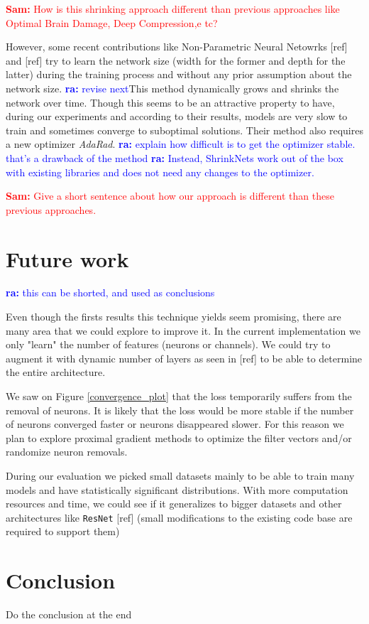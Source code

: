 \documentclass[sigconf]{acmart}
\newcommand{\srm}[1]{\textcolor{red}{{\bf Sam:} #1}}
\newcommand{\ra}[1]{\textcolor{blue}{{\bf ra:} #1}}
\begin{document}
\srm{How is this shrinking
approach different than previous approaches like Optimal Brain Damage, Deep
Compression,e tc?} 

\par However, some recent contributions like Non-Parametric Neural Netowrks
[ref] and [ref] try to learn the network size (width for the former and depth
for the latter) during the training process and without any prior assumption
about the network size. \ra{revise next}This method dynamically grows and shrinks the network
over time. Though this seems to be an attractive property to have, during our
experiments and according to their results, models are very slow to train and
sometimes converge to suboptimal solutions. Their method also requires a new
optimizer \textit{AdaRad}. \ra{explain how difficult is to get the optimizer
stable. that's a drawback of the method} \ra{Instead, ShrinkNets work out of the
box with existing libraries and does not need any changes to the optimizer.}

\srm{Give a short sentence about how our approach is
different than these previous approaches.} 

\section{Future work}

\ra{this can be shorted, and used as conclusions}

\par Even though the firsts results this technique yields seem promising, there
are many area that we could explore to improve it. In the current implementation
we only "learn" the number of features (neurons or channels). We could try to
augment it with dynamic number of layers as seen in [ref] to be able to
determine the entire architecture.  \par We saw on Figure \ref{convergence_plot}
that the loss temporarily suffers from the removal of neurons. It is likely that
the loss would be more stable if the number of neurons converged faster or
neurons disappeared slower. For this reason we plan to explore proximal gradient
methods to optimize the filter vectors and/or randomize neuron removals.  \par
During our evaluation we picked small datasets mainly to be able to train many
models and have statistically significant distributions. With more computation
resources and time, we could see if it generalizes to bigger datasets and other
architectures like \texttt{ResNet} [ref] (small modifications to the existing
code base are required to support them)

\section{Conclusion}
Do the conclusion at the end



\end{document}
